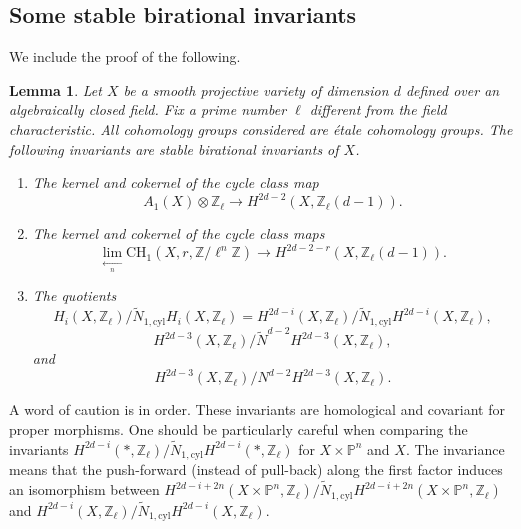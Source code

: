 \documentclass{amsart}
\newtheorem{lem}[theorem]{Lemma}
\theoremstyle{definition}
\theoremstyle{remark}
\newcommand{\mbb}{\mathbb}
\newcommand{\ZZ}{\mbb{Z}}
\newcommand{\PP}{\mbb{P}}
\newcommand{\cyl}{\text{cyl}}
\begin{document}
\subsection{Some stable birational invariants}\label{sec:bir}
We include the proof of the following.
\begin{lem}\label{lem:birational}
    Let $X$ be a smooth projective variety of dimension $d$ defined over an algebraically closed field. Fix a prime number $\ell$ different from the field characteristic. All cohomology groups considered are \'etale cohomology groups. The following invariants are stable birational invariants of $X$.
    \begin{enumerate}
        \item The kernel and cokernel of the cycle class map 
        \[
        A_1(X)\otimes \ZZ_\ell \to H^{2d-2}(X, \ZZ_\ell(d-1)).
        \]
        
        \item The kernel and cokernel of the cycle class maps
        \begin{equation}\label{eq:highercyc}
            \lim \limits_{\xleftarrow[n]{}}\text{CH}_1({X}, r, \ZZ/\ell^n \ZZ) \to H^{2d-2-r}({X}, \ZZ_\ell(d-1)).
        \end{equation}

        \item The quotients $$H_{i}(X, \ZZ_\ell)/\tilde{N}_{1, \cyl}H_{i}(X, \ZZ_\ell)=H^{2d-i}(X, \ZZ_\ell)/\tilde{N}_{1, \cyl}H^{2d-i}(X, \ZZ_\ell),$$ $$H^{2d-3}(X, \ZZ_\ell)/\tilde{N}^{d-2}H^{2d-3}(X, \ZZ_\ell),$$
        and 
        $$H^{2d-3}(X, \ZZ_\ell)/{N}^{d-2}H^{2d-3}(X, \ZZ_\ell).$$

       
    \end{enumerate}
\end{lem}
 A word of caution is in order. These invariants are homological and covariant for proper morphisms. 
 One should be particularly careful when comparing the invariants $H^{2d-i}(*, \ZZ_\ell)/\tilde{N}_{1, \cyl}H^{2d-i}(*, \ZZ_\ell)$ for $X\times \PP^n$ and $X$. The invariance means that the push-forward (instead of pull-back) along the first factor induces an isomorphism between $H^{2d-i+2n}(X\times \PP^n, \ZZ_\ell)/\tilde{N}_{1, \cyl}H^{2d-i+2n}(X\times \PP^n, \ZZ_\ell)$ and $H^{2d-i}(X, \ZZ_\ell)/\tilde{N}_{1, \cyl}H^{2d-i}(X, \ZZ_\ell)$.
    
\end{document}
